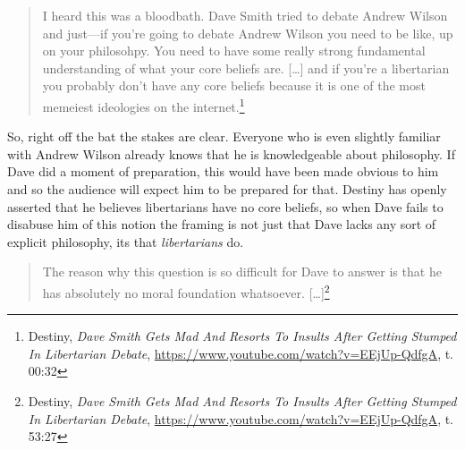 \documentclass[11pt]{article}
\begin{document}
\begin{quote}
I heard this was a bloodbath. Dave Smith tried to debate Andrew Wilson and just---if you're going to debate Andrew Wilson you need to be like, up on your philosohpy. You need to have some really strong fundamental understanding of what your core beliefs are. [\ldots{}] and if you're a libertarian you probably don't have any core beliefs because it is one of the most memeiest ideologies on the internet.\footnote{Destiny, \emph{Dave Smith Gets Mad And Resorts To Insults After Getting Stumped In Libertarian Debate}, \url{https://www.youtube.com/watch?v=EEjUp-QdfgA}, t. 00:32}
\end{quote}

So, right off the bat the stakes are clear. Everyone who is even slightly familiar with Andrew Wilson already knows that he is knowledgeable about philosophy. If Dave did a moment of preparation, this would have been made obvious to him and so the audience will expect him to be prepared for that. Destiny has openly asserted that he believes libertarians have no core beliefs, so when Dave fails to disabuse him of this notion the framing is not just that Dave lacks any sort of explicit philosophy, its that \emph{libertarians} do.

\begin{quote}
The reason why this question is so difficult for Dave to answer is that he has absolutely no moral foundation whatsoever. [\ldots{}]\footnote{Destiny, \emph{Dave Smith Gets Mad And Resorts To Insults After Getting Stumped In Libertarian Debate}, \url{https://www.youtube.com/watch?v=EEjUp-QdfgA}, t. 53:27}
\end{quote}
\end{document}
